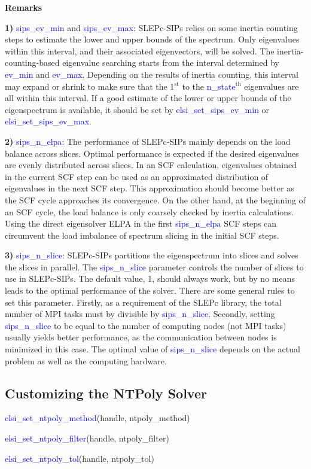 \documentclass{report}
\newcommand{\tcb}[1]{\textcolor{blue}{#1}}
\begin{document}
\textbf{Remarks}

\textbf{1)} \tcb{sips\_ev\_min} and \tcb{sips\_ev\_max}: SLEPc-SIPs relies on some inertia counting steps to estimate the lower and upper bounds of the spectrum. Only eigenvalues within this interval, and their associated eigenvectors, will be solved. The inertia-counting-based eigenvalue searching starts from the interval determined by \tcb{ev\_min} and \tcb{ev\_max}. Depending on the results of inertia counting, this interval may expand or shrink to make sure that the 1$^\text{st}$ to the \tcb{n\_state}$^\text{th}$ eigenvalues are all within this interval. If a good estimate of the lower or upper bounds of the eigenspectrum is available, it should be set by \tcb{elsi\_set\_sips\_ev\_min} or \tcb{elsi\_set\_sips\_ev\_max}.

\textbf{2)} \tcb{sips\_n\_elpa}: The performance of SLEPc-SIPs mainly depends on the load balance across slices. Optimal performance is expected if the desired eigenvalues are evenly distributed across slices. In an SCF calculation, eigenvalues obtained in the current SCF step can be used as an approximated distribution of eigenvalues in the next SCF step. This approximation should become better as the SCF cycle approaches its convergence. On the other hand, at the beginning of an SCF cycle, the load balance is only coarsely checked by inertia calculations. Using the direct eigensolver ELPA in the first \tcb{sips\_n\_elpa} SCF steps can circumvent the load imbalance of spectrum slicing in the initial SCF steps.

\textbf{3)} \tcb{sips\_n\_slice}: SLEPc-SIPs partitions the eigenspectrum into slices and solves the slices in parallel. The \tcb{sips\_n\_slice} parameter controls the number of slices to use in SLEPc-SIPs. The default value, 1, should always work, but by no means leads to the optimal performance of the solver. There are some general rules to set this parameter. Firstly, as a requirement of the SLEPc library, the total number of MPI tasks must by divisible by \tcb{sips\_n\_slice}. Secondly, setting \tcb{sips\_n\_slice} to be equal to the number of computing nodes (not MPI tasks) usually yields better performance, as the communication between nodes is minimized in this case. The optimal value of \tcb{sips\_n\_slice} depends on the actual problem as well as the computing hardware.

\subsection{Customizing the NTPoly Solver}
\label{subsec:setter_ntpoly}
\begin{labeling}{\hspace{6cm}}
\item [\hspace{0.3cm} \tcb{elsi\_set\_ntpoly\_method}(handle, ntpoly\_method)]
\item [\hspace{0.3cm} \tcb{elsi\_set\_ntpoly\_filter}(handle, ntpoly\_filter)]
\item [\hspace{0.3cm} \tcb{elsi\_set\_ntpoly\_tol}(handle, ntpoly\_tol)]
\end{labeling}
\end{document}
